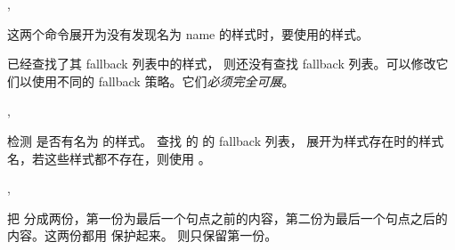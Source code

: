 \documentclass[class=article,openany]{cusdoc}[2025/09/29]
\begin{document}
\begin{function}[EXP]{\texhigh@fallback,\texhigh@fallback@}
  \begin{syntax}
    \V{\texhigh@fallback}   
    \V{\texhigh@fallback@}  
  \end{syntax}
这两个命令展开为没有发现名为 name 的样式时，要使用的样式。

 已经查找了其 fallback 列表中的样式， 则还没有查找 fallback 列表。可以修改它们以使用不同的 fallback 策略。它们\emph{必须完全可展}。
\end{function}

\begin{function}[EXP]{\texhigh@cat@if@exists,\texhigh@cat@fallback}
  \begin{syntax}
    \V{\texhigh@cat@if@exists}    
    \V{\texhigh@cat@fallback}   
  \end{syntax}
 检测  是否有名为  的样式。
 查找  的  的 fallback 列表，
展开为样式存在时的样式名，若这些样式都不存在，则使用 。
\end{function}

\begin{function}[EXP]{\texhigh@find@dotparent,\texhigh@dot@split}
  \begin{syntax}
    \V{\texhigh@dot@split} 
    \V{\texhigh@find@dotparent} 
  \end{syntax}
 把  分成两份，第一份为最后一个句点之前的内容，第二份为最后一个句点之后的内容。这两份都用  保护起来。
 则只保留第一份。
\end{function}

\begin{xample}
\makeatletter
\def\printstr#1{\detokenize\expandafter{\expanded{#1}}}
\printstr{\texhigh@dot@split {\a.b.c.\d}}\quad
\printstr{\texhigh@find@dotparent {\a.b.c.\d}}\quad
\makeatother
\stopxamplecode
{}
\xampleprint
\end{xample}
\end{document}
